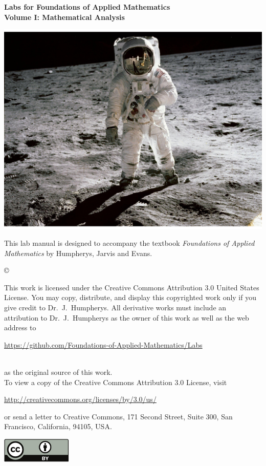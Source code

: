 \documentclass[nociteref]{SIAM-GH-book}
\begin{document}

\thispagestyle{empty} %

\begin{center}
{\huge \bf Labs for Foundations of Applied Mathematics} \\
\vspace{5mm}
{\Large \bf Volume I: Mathematical Analysis}
\vspace{20mm}

\includegraphics[scale=.5]{Cover.pdf}
\end{center}
\frontmatter



\begin{thepreface} %

This lab manual is designed to accompany the textbook \emph{Foundations of Applied Mathematics} by Humpherys, Jarvis and Evans.

\vfill
\copyright{This work is licensed under the Creative Commons Attribution 3.0 United States
License.  You may copy, distribute, and display this copyrighted work only if you give
credit to Dr.~J.~Humpherys. All derivative works must include an attribution to Dr.~J.~Humpherys as the owner of this work as well as the web address to
\\\centerline{\url{https://github.com/Foundations-of-Applied-Mathematics/Labs}}\\as the original source of this work.
\\To view a copy of the Creative Commons Attribution 3.0 License, visit
\\\centerline{\url{http://creativecommons.org/licenses/by/3.0/us/}} or send a letter to Creative Commons, 171 Second Street, Suite 300, San Francisco, California, 94105, USA.}

\vfill
\centering\includegraphics[height=1.2cm]{by.pdf}
\vfill
\end{thepreface}
\end{document}
